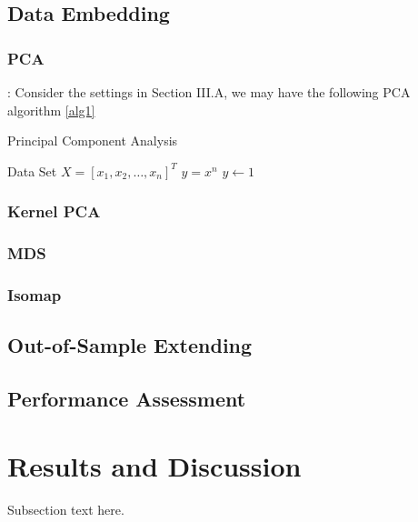 \documentclass[journal]{IEEEtran}
\begin{document}
\subsection{Data Embedding}
\subsubsection{PCA}: Consider the settings in Section III.A, we may have the following PCA algorithm \ref{alg1}

\begin{algorithm}
 \caption{Principal Component Analysis}
 \label{alg1}
 \begin{algorithmic}
 \REQUIRE Data Set $ X = [x_1, x_2, \ldots, x_n]^T$
 \ENSURE $y = x^n$
 \STATE $y \leftarrow 1$
  \end{algorithmic}
 \end{algorithm}



\subsubsection{Kernel PCA}

\subsubsection{MDS}

\subsubsection{Isomap}

\subsection{Out-of-Sample Extending}

\subsection{Performance Assessment}



\section{Results and Discussion}

Subsection text here.
\end{document}
